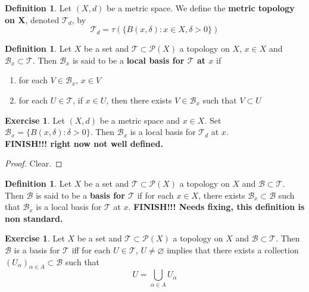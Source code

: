 \documentclass[12pt]{amsart}
\theoremstyle{definition}
\newtheorem{defn}[definition]{Definition}
\newtheorem{ex}[definition]{Exercise}
\newcommand{\al}{\alpha}
\newcommand{\del}{\delta}
\newcommand{\MB}{\mathcal{B}}
\newcommand{\MP}{\mathcal{P}}
\newcommand{\MT}{\mathcal{T}}
\newcommand{\lex}[1]{\label{ex:#1}}
\newcommand{\ld}[1]{\label{defn:#1}}
\begin{document}
	\begin{defn} \ld{31004}
	Let $(X,d)$ be a metric space. We define the \textbf{metric topology on X}, denoted $\MT_d$, by $$\MT_d = \tau(\{B(x, \del): x \in X, \del >0\})$$
	\end{defn}
	
	\begin{defn} \ld{31005}
	Let $X$ be a set and $\MT \subset \MP(X)$ a topology on $X$, $x \in X$ and $\MB_x \subset \MT$. Then $\MB_x$ is said to be a \textbf{local basis for $\MT$ at $x$} if 
	\begin{enumerate}
	\item for each $V \in \MB_x$, $x \in V$
	\item for each $U \in \MT$, if $x \in U$, then there exists $V \in \MB_x$ such that $V \subset U$
	\end{enumerate}
	\end{defn}
	
	\begin{ex} \lex{31006}
	Let $(X,d)$ be a metric space and $x \in X$. Set $\MB_x = \{B(x, \del): \del > 0\}$. Then $\MB_x$ is a local basis for $\MT_d$ at $x$. \\
	\textbf{FINISH!!! right now not well defined.}
	\end{ex}	
	
	\begin{proof}
	Clear.
	\end{proof}
	
	\begin{defn} \ld{31007}
	Let $X$ be a set and $\MT \subset \MP(X)$ a topology on $X$ and $\MB \subset \MT$. Then $\MB$ is said to be a \textbf{basis for $\MT$} if for each $x \in X$, there exists $\MB_x \subset \MB$ such that $\MB_x$ is a local basis for $\MT$ at $x$.
	\textbf{FINISH!!! Needs fixing, this definition is non standard.} 
	\end{defn}
	
	\begin{ex} \lex{31008}
	Let $X$ be a set and $\MT \subset \MP(X)$ a topology on $X$ and $\MB \subset \MT$. Then $\MB$ is a basis for $\MT$ iff for each $U \in \MT$, $U \neq \varnothing$ implies that there exists a collection $(U_{\al})_{\al \in A} \subset \MB$ such that $$U = \bigcup\limits_{\al \in A} U_{\al}$$
	\end{ex}
	
\end{document}
